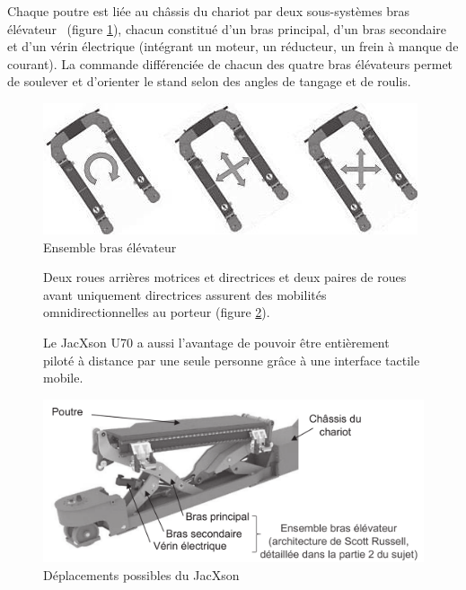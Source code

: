 Chaque poutre est liée au châssis du chariot par deux sous-systèmes \og bras élévateur \fg\ (figure \ref{fig03}), chacun constitué d'un bras principal, d'un bras secondaire et d'un vérin électrique (intégrant un moteur, un réducteur, un frein à manque de courant). La commande différenciée de chacun des quatre bras élévateurs permet de soulever et d'orienter le stand selon des angles de tangage et de roulis.

\begin{figure}[ht!]
\begin{center}
 \includegraphics[width=0.6\linewidth]{img/fig03}
\end{center}
\caption{\label{fig03} Ensemble bras élévateur}
\end{figure}

\begin{figure}[ht!]
\begin{minipage}{0.35\linewidth}
Deux roues arrières motrices et directrices et deux paires de roues avant uniquement directrices assurent des mobilités omnidirectionnelles au porteur (figure \ref{fig04}).

Le JacXson U70 a aussi l'avantage de pouvoir être entièrement piloté à distance par une seule personne grâce à une interface tactile mobile.
\end{minipage}\hfill
\begin{minipage}{0.6\linewidth}
\begin{center}
 \includegraphics[width=0.9\linewidth]{img/fig04}
\end{center}
\caption{\label{fig04} Déplacements possibles du JacXson}
\end{minipage}
\end{figure}

